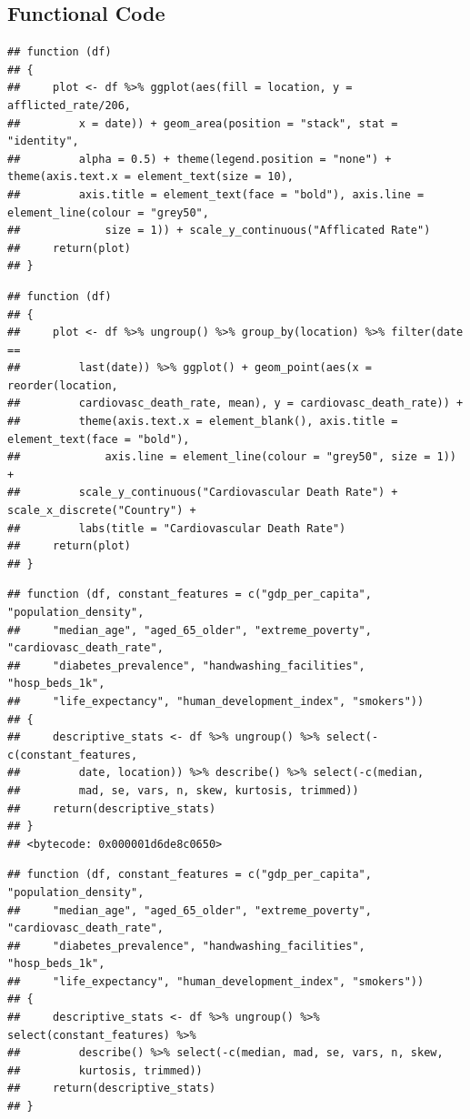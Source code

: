 \documentclass[11pt,preprint, authoryear]{elsarticle}
\numberwithin{equation}{section}
\numberwithin{figure}{section}
\numberwithin{table}{section}
\begin{document}
\hypertarget{functional-code}{%
\subsection{Functional Code}\label{functional-code}}

\begin{verbatim}
## function (df) 
## {
##     plot <- df %>% ggplot(aes(fill = location, y = afflicted_rate/206, 
##         x = date)) + geom_area(position = "stack", stat = "identity", 
##         alpha = 0.5) + theme(legend.position = "none") + theme(axis.text.x = element_text(size = 10), 
##         axis.title = element_text(face = "bold"), axis.line = element_line(colour = "grey50", 
##             size = 1)) + scale_y_continuous("Afflicated Rate")
##     return(plot)
## }
\end{verbatim}

\begin{verbatim}
## function (df) 
## {
##     plot <- df %>% ungroup() %>% group_by(location) %>% filter(date == 
##         last(date)) %>% ggplot() + geom_point(aes(x = reorder(location, 
##         cardiovasc_death_rate, mean), y = cardiovasc_death_rate)) + 
##         theme(axis.text.x = element_blank(), axis.title = element_text(face = "bold"), 
##             axis.line = element_line(colour = "grey50", size = 1)) + 
##         scale_y_continuous("Cardiovascular Death Rate") + scale_x_discrete("Country") + 
##         labs(title = "Cardiovascular Death Rate")
##     return(plot)
## }
\end{verbatim}

\begin{verbatim}
## function (df, constant_features = c("gdp_per_capita", "population_density", 
##     "median_age", "aged_65_older", "extreme_poverty", "cardiovasc_death_rate", 
##     "diabetes_prevalence", "handwashing_facilities", "hosp_beds_1k", 
##     "life_expectancy", "human_development_index", "smokers")) 
## {
##     descriptive_stats <- df %>% ungroup() %>% select(-c(constant_features, 
##         date, location)) %>% describe() %>% select(-c(median, 
##         mad, se, vars, n, skew, kurtosis, trimmed))
##     return(descriptive_stats)
## }
## <bytecode: 0x000001d6de8c0650>
\end{verbatim}

\begin{verbatim}
## function (df, constant_features = c("gdp_per_capita", "population_density", 
##     "median_age", "aged_65_older", "extreme_poverty", "cardiovasc_death_rate", 
##     "diabetes_prevalence", "handwashing_facilities", "hosp_beds_1k", 
##     "life_expectancy", "human_development_index", "smokers")) 
## {
##     descriptive_stats <- df %>% ungroup() %>% select(constant_features) %>% 
##         describe() %>% select(-c(median, mad, se, vars, n, skew, 
##         kurtosis, trimmed))
##     return(descriptive_stats)
## }
\end{verbatim}
\end{document}
